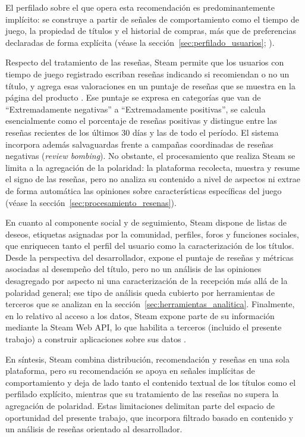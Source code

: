 El perfilado sobre el que opera esta recomendación es predominantemente implícito: se construye a partir de señales de comportamiento como el tiempo de juego, la propiedad de títulos y el historial de compras, más que de preferencias declaradas de forma explícita (véase la sección~\ref{sec:perfilado_usuarios}; \parencite{CheuqueEtAl2019, ViljanenEtAl2020}).

Respecto del tratamiento de las reseñas, Steam permite que los usuarios con tiempo de juego registrado escriban reseñas indicando si recomiendan o no un título, y agrega esas valoraciones en un puntaje de reseñas que se muestra en la página del producto \parencite{ValveCorporationReviews}. Ese puntaje se expresa en categorías que van de \enquote{Extremadamente negativas} a \enquote{Extremadamente positivas}, se calcula esencialmente como el porcentaje de reseñas positivas y distingue entre las reseñas recientes de los últimos 30 días y las de todo el período. El sistema incorpora además salvaguardas frente a campañas coordinadas de reseñas negativas (\emph{review bombing}). No obstante, el procesamiento que realiza Steam se limita a la agregación de la polaridad: la plataforma recolecta, muestra y resume el signo de las reseñas, pero no analiza su contenido a nivel de aspectos ni extrae de forma automática las opiniones sobre características específicas del juego (véase la sección~\ref{sec:procesamiento_resenas}).

En cuanto al componente social y de seguimiento, Steam dispone de listas de deseos, etiquetas asignadas por la comunidad, perfiles, foros y funciones sociales, que enriquecen tanto el perfil del usuario como la caracterización de los títulos. Desde la perspectiva del desarrollador, expone el puntaje de reseñas y métricas asociadas al desempeño del título, pero no un análisis de las opiniones desagregado por aspecto ni una caracterización de la recepción más allá de la polaridad general; ese tipo de análisis queda cubierto por herramientas de terceros que se analizan en la sección~\ref{sec:herramientas_analitica}. Finalmente, en lo relativo al acceso a los datos, Steam expone parte de su información mediante la Steam Web API, lo que habilita a terceros (incluido el presente trabajo) a construir aplicaciones sobre sus datos \parencite{ValveCorporationReviews}.

En síntesis, Steam combina distribución, recomendación y reseñas en una sola plataforma, pero su recomendación se apoya en señales implícitas de comportamiento y deja de lado tanto el contenido textual de los títulos como el perfilado explícito, mientras que su tratamiento de las reseñas no supera la agregación de polaridad. Estas limitaciones delimitan parte del espacio de oportunidad del presente trabajo, que incorpora filtrado basado en contenido y un análisis de reseñas orientado al desarrollador.

